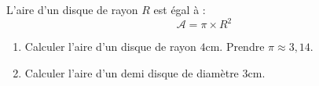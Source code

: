 \documentclass[a4paper,10pt]{report}
\begin{document}
\vspace{2.5cm}
\begin{prop}
L'aire d'un disque de rayon $R$ est égal à :
$$\mathcal{A} = \pi \times R^2$$
\end{prop}

\begin{ex}
\begin{enumerate}
\item Calculer l'aire d'un disque de rayon $4$cm. Prendre $\pi \approx 3,14$.

\noindent\grandscarreaux{\linewidth}{2.2cm}
\item Calculer l'aire d'un demi disque de diamètre $3$cm.

\noindent\grandscarreaux{\linewidth}{2.2cm}
\end{enumerate}
\end{ex}
\end{document}
